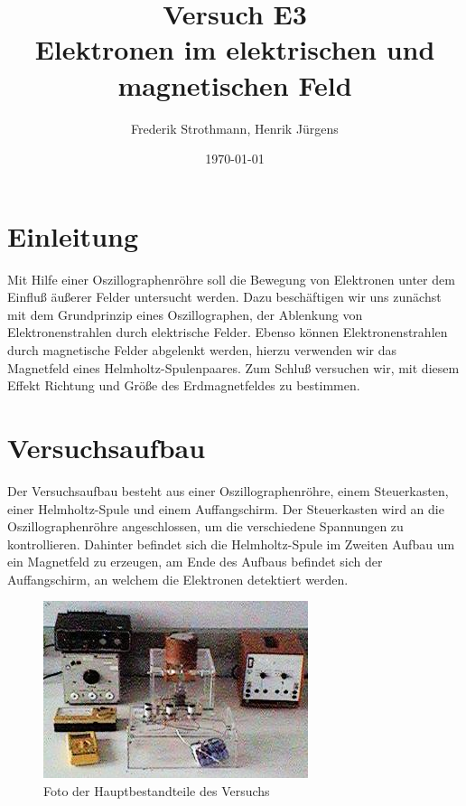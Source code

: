 \documentclass[12pt]{scrartcl}
\title{Versuch E3\\ Elektronen im elektrischen und magnetischen Feld}
\author{Frederik Strothmann, Henrik Jürgens}
\date{\today}
\begin{document}

\maketitle
\tableofcontents
\newpage


\section{Einleitung}
Mit Hilfe einer Oszillographenröhre soll die Bewegung von Elektronen unter dem Einfluß äußerer Felder untersucht werden. Dazu beschäftigen wir uns zunächst mit dem Grundprinzip eines Oszillographen, der Ablenkung von Elektronenstrahlen durch elektrische Felder. Ebenso können Elektronenstrahlen durch magnetische Felder abgelenkt werden, hierzu verwenden wir das Magnetfeld eines Helmholtz-Spulenpaares. Zum Schluß versuchen wir, mit diesem Effekt Richtung und Größe des Erdmagnetfeldes zu bestimmen.


\section{Versuchsaufbau}
Der Versuchsaufbau besteht aus einer Oszillographenröhre, einem Steuerkasten, einer Helmholtz-Spule und einem Auffangschirm.
Der Steuerkasten wird an die Oszillographenröhre angeschlossen, um die verschiedene Spannungen zu kontrollieren. Dahinter befindet sich die Helmholtz-Spule im Zweiten Aufbau um ein Magnetfeld zu erzeugen, am Ende des Aufbaus befindet sich der Auffangschirm, an welchem die Elektronen detektiert werden.

\begin{figure}[htbp] 
  \centering
    \includegraphics[scale = 0.5]{aufbau.JPG}
  	\caption[Foto der Hauptbestandteile des Versuchs]{Foto der Hauptbestandteile des Versuchs\footnotemark}
  \label{fig:aufbau}
\end{figure}
\end{document}
